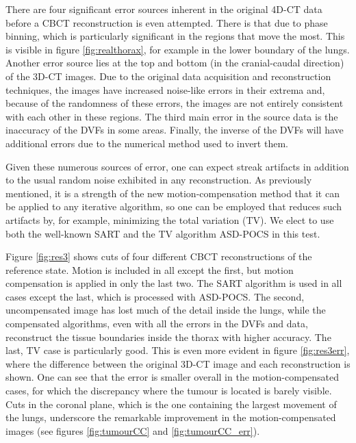 There are four significant error sources inherent in the original 4D-CT data before a CBCT reconstruction is even attempted.  There is that due to phase binning, which is particularly significant in the regions that move the most.  This is visible in figure \ref{fig:realthorax}, for example in the lower boundary of the lungs.  Another error source lies at the top and bottom (in the cranial-caudal direction) of the 3D-CT images.  Due to the original data acquisition and reconstruction techniques, the images have increased noise-like errors in their extrema and, because of the randomness of these errors, the images are not entirely consistent with each other in these regions.  The third main error in the source data is the inaccuracy of the DVFs in some areas.  Finally, the inverse of the DVFs will have additional errors due to the numerical method used to invert them.

Given these numerous sources of error, one can expect streak artifacts in addition to the usual random noise exhibited in any reconstruction.  As previously mentioned, it is a strength of the new motion-compensation method that it can be applied to any iterative algorithm, so one can be employed that reduces such artifacts by, for example, minimizing the total variation (TV).  We elect to use both the well-known SART and the TV algorithm ASD-POCS\cite{ASD_POCS} in this test.

Figure \ref{fig:res3} shows cuts of four different CBCT reconstructions of the reference state.  Motion is included in all except the first, but motion compensation is applied in only the last two.  The SART algorithm is used in all cases except the last, which is processed with ASD-POCS.  The second, uncompensated image has lost much of the detail inside the lungs, while the compensated algorithms, even with all the errors in the DVFs and data, reconstruct the tissue boundaries inside the thorax with higher accuracy.  The last, TV case is particularly good.  This is even more evident in figure \ref{fig:res3err}, where the difference between the original 3D-CT image and each reconstruction is shown.  One can see that the error is smaller overall in the motion-compensated cases, for which the discrepancy where the tumour is located is barely visible.  Cuts in the coronal plane, which is the one containing the largest movement of the lungs, underscore the remarkable improvement in the motion-compensated images (see figures \ref{fig:tumourCC} and \ref{fig:tumourCC_err}).

